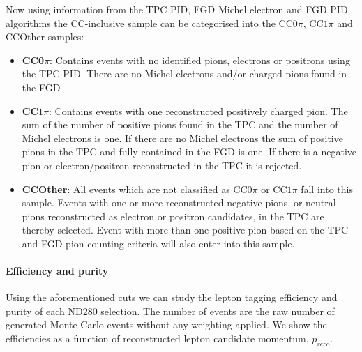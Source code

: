 Now using information from the TPC PID, FGD Michel electron and FGD PID algorithms the \numu CC-inclusive sample can be categorised into the CC$0\pi$, CC$1\pi$ and CCOther samples:
\begin{itemize}
	\item \textbf{CC0$\pi$}: Contains events with no identified pions, electrons or positrons using the TPC PID. There are no Michel electrons and/or charged pions found in the FGD
	\item \textbf{CC$1\pi$}: Contains events with one reconstructed positively charged pion. The sum of the number of positive pions found in the TPC and the number of Michel electrons is one. If there are no Michel electrons the sum of positive pions in the TPC and fully contained in the FGD is one. If there is a negative pion or electron/positron reconstructed in the TPC it is rejected.
	\item \textbf{CCOther}: All events which are not classified as CC0$\pi$ or CC$1\pi$ fall into this sample. Events with one or more reconstructed negative pions, or neutral pions reconstructed as electron or positron candidates, in the TPC are thereby selected. Event with more than one positive pion based on the TPC and FGD pion counting criteria will also enter into this sample.
\end{itemize}

\paragraph{Efficiency and purity}
Using the aforementioned cuts we can study the lepton tagging efficiency and purity of each ND280 \numu selection. The number of events are the raw number of generated Monte-Carlo events without any weighting applied. We show the efficiencies as a function of reconstructed lepton candidate momentum, $p_{reco}$.

